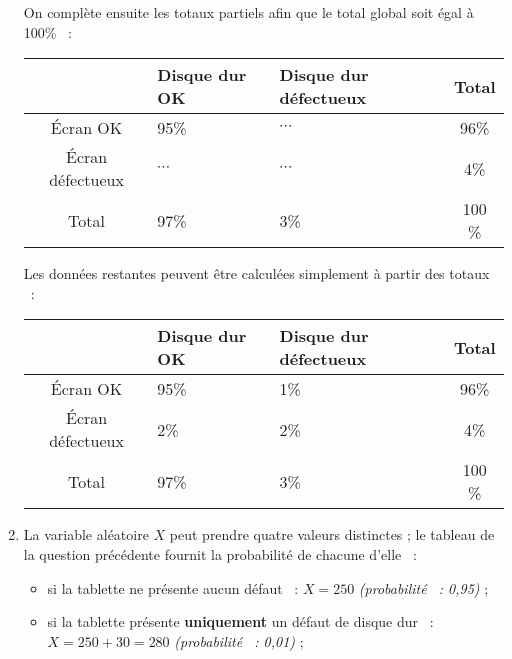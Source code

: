 \begin{corrige}
\begin{enumerate}
\begin{center}
          \end{center}
          On complète ensuite les totaux partiels afin que le total global soit égal à 100\% ~:
          \begin{center}
               \begin{tabular}{|c|p{2cm}|p{2cm}|c|}%
                    \hline
                    $\ $ & Disque dur OK & Disque dur défectueux & Total \\
                    \hline
                    \'Ecran OK &  95\% & $\cdots$ & 96\% \\
                    \hline
                    \'Ecran défectueux & $\cdots$ & $\cdots$ & 4\% \\
                    \hline
                    Total & 97\% & 3\% & 100 \% \\
                    \hline
               \end{tabular}
          \end{center}
          Les données restantes peuvent être calculées simplement à partir des totaux ~:
          \begin{center}
               \begin{tabular}{|c|p{2cm}|p{2cm}|c|}%
                    \hline
                    $\ $ & Disque dur OK & Disque dur défectueux & Total \\
                    \hline
                    \'Ecran OK &  95\% & 1\% & 96\% \\
                    \hline
                    \'Ecran défectueux & 2\% & 2\%  & 4\% \\
                    \hline
                    Total & 97\% & 3\% & 100 \% \\
                    \hline
               \end{tabular}
          \end{center}
          \item %
          \par
          La variable aléatoire $X$ peut prendre quatre valeurs distinctes ; le tableau de la question précédente fournit la probabilité de chacune d'elle ~:
          \par
          \begin{itemize}
               \item si la tablette ne présente aucun défaut ~: ${X=250}$ \textit{(probabilité ~: 0,95)} ;
               \par
               \item si la tablette présente \textbf{uniquement} un défaut de disque dur ~: ${X=250+30=280}$ \textit{(probabilité ~: 0,01)} ;

\end{itemize}
\end{enumerate}
\end{corrige}
